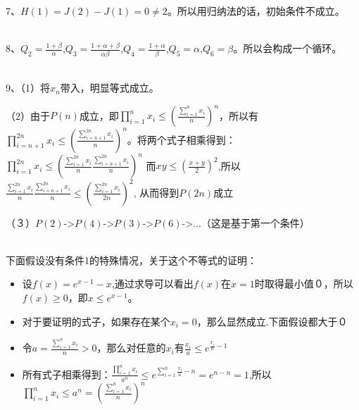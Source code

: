 \documentclass[onecolumn]{article}
\begin{document}
7、$H(1)=J(2)-J(1)=0 \ne 2$。所以用归纳法的话，初始条件不成立。
\par ~\\

8、$Q_{2}=\frac{1+\beta }{\alpha }$,$Q_{3}=\frac{1+\alpha +\beta }{\alpha \beta }$,$Q_{4}=\frac{1+\alpha }{\beta }$,$Q_{5}=\alpha $,$Q_{6}=\beta $。所以会构成一个循环。
\par ~\\

9、（1）将$x_{n}$带入，明显等式成立。\par
（2）由于$P(n)$成立，即$\prod_{i=1}^{n}x_{i} \leq (\frac{\sum_{i=1}^{n}x_{i}}{n})^{n}$，所以有$\prod_{i=n+1}^{2n}x_{i}\leq (\frac{\sum_{i=n+1}^{2n}x_{i}}{n})^{n}$。将两个式子相乘得到： 
$\prod_{i=1}^{2n}x_{i}\leq (\frac{\sum_{i=1}^{2n}x_{i}}{n}\frac{\sum_{i=n+1}^{2n}x_{i}}{n})^{n}$
而$xy\leq (\frac{x+y}{2})^2$,所以$ \frac{\sum_{i=1}^{2n}x_{i}}{n}\frac{\sum_{i=n+1}^{2n}x_{i}}{n}\leq \left (\frac{\sum_{i=1}^{2n}x_{i}}{2n}  \right )^{2}$, 从而得到$P(2n)$成立\par
（３）$P(2)$->$P(4)$->$P(3)$->$P(6)$->...（这是基于第一个条件） \par
~\\
下面假设没有条件1的特殊情况，关于这个不等式的证明： \par
\begin{itemize}
	\item 设$f(x)=e^{x-1}-x$,通过求导可以看出$f(x)$在$x=1$时取得最小值０，所以$f(x)\geq 0$，即$x \leq e^{x-1}$。
	\item 对于要证明的式子，如果存在某个$x_{i}=0$，那么显然成立.下面假设都大于０
	\item 令$a=\frac{\sum_{i=1}^{n}x_{i}}{n}>0$，那么对任意的$x_{i}$有$\frac{x_{i}}{a}\leq e^{\frac{x_{i}}{a}-1}$ 
	\item 所有式子相乘得到：$\frac{\prod_{i=1}^{n}x_{i}}{a^n}\leq e^{\sum_{i=1}^{n}\frac{x_{i}}{a}-n}=e^{n-n}=1$,所以$\prod_{i=1}^{n}x_{i}\leq a^{n}=\left ( \frac{\sum_{i=1}^{n}x_{i}}{n} \right )^n$
\end{itemize}
\end{document}
